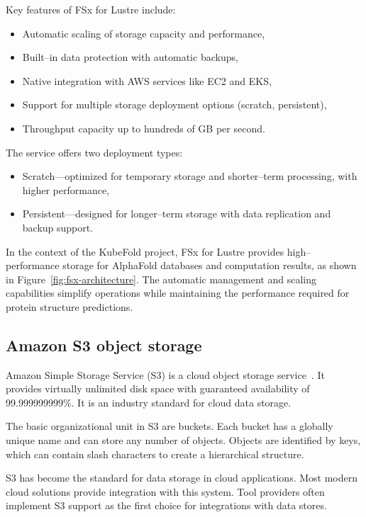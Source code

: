 Key features of FSx for Lustre include:
\begin{itemize}
    \item Automatic scaling of storage capacity and performance,
    \item Built--in data protection with automatic backups,
    \item Native integration with AWS services like EC2 and EKS,
    \item Support for multiple storage deployment options (scratch, persistent),
    \item Throughput capacity up to hundreds of GB per second.
\end{itemize}

The service offers two deployment types:
\begin{itemize}
    \item Scratch—optimized for temporary storage and shorter--term processing, with higher performance,
    \item Persistent—designed for longer--term storage with data replication and backup support.
\end{itemize}

In the context of the KubeFold project, FSx for Lustre provides high--performance storage for AlphaFold databases and computation results, as shown in Figure~\ref{fig:fsx-architecture}.
The automatic management and scaling capabilities simplify operations while maintaining the performance required for protein structure predictions.

\subsection{Amazon S3 object storage}\label{subsec:amazon-s3-object-storage}

Amazon Simple Storage Service (S3) is a cloud object storage service~\cite{aws_s3}.
It provides virtually unlimited disk space with guaranteed availability of 99.999999999\%.
It is an industry standard for cloud data storage.

The basic organizational unit in S3 are buckets.
Each bucket has a globally unique name and can store any number of objects.
Objects are identified by keys, which can contain slash characters to create a hierarchical structure.

S3 has become the standard for data storage in cloud applications.
Most modern cloud solutions provide integration with this system.
Tool providers often implement S3 support as the first choice for integrations with data stores.

